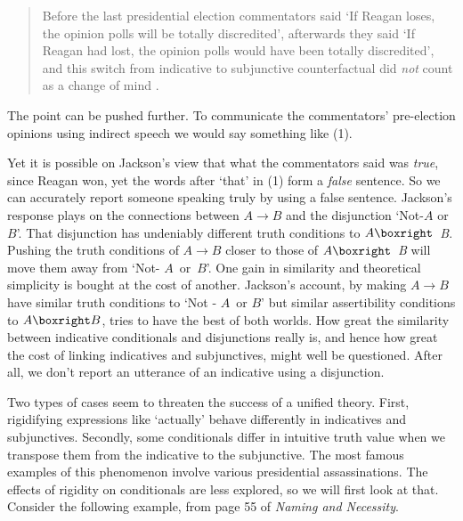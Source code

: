 \begin{quote}
Before the last presidential election commentators said `If Reagan loses, the opinion polls will be totally discredited', afterwards they said `If Reagan had lost, the opinion polls would have been totally discredited', and this switch from indicative to subjunctive counterfactual did \textit{not} count as a change of mind \cite[66]{Jackson1987}.
\end{quote}

The point can be pushed further. To communicate the commentators' pre-election opinions using indirect speech we would say something like (1).


\noindent Yet it is possible on Jackson's view that what the commentators said was \textit{true}, since Reagan won, yet the words after `that' in (1) form a \textit{false} sentence. So we can accurately report someone speaking truly by using a false sentence. Jackson's response plays on the connections between \(A \rightarrow B\) and the disjunction `Not-\(A\) or \(B\)'. That disjunction has undeniably different truth conditions to \(A \boxright\)\textit{~B}. Pushing the truth conditions of \(A \rightarrow B\) closer to those of \(A \boxright\)\textit{~B} will move them away from `Not\nobreakdash- \(A\)~or~\(B\)'. One gain in similarity and theoretical simplicity is bought at the cost of another. Jackson's account, by making \(A \rightarrow B\) have similar truth conditions to `Not \nobreakdash- \(A\)~or \(B\)' but similar assertibility conditions to \(A \boxright B\), tries to have the best of both worlds. How great the similarity between indicative conditionals and disjunctions really is, and hence how great the cost of linking indicatives and subjunctives, might well be questioned. After all, we don't report an utterance of an indicative using a disjunction.

Two types of cases seem to threaten the success of a unified theory. First, rigidifying expressions like `actually' behave differently in indicatives and subjunctives. Secondly, some conditionals differ in intuitive truth value when we transpose them from the indicative to the subjunctive. The most famous examples of this phenomenon involve various presidential assassinations. The effects of rigidity on conditionals are less explored, so we will first look at that. Consider the following example, from page 55 of \textit{Naming and Necessity}.

